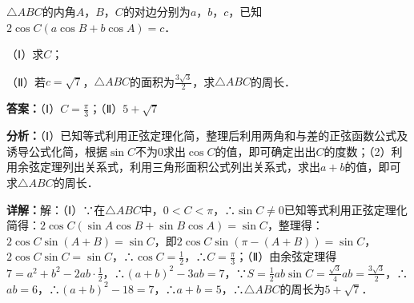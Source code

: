 \begin{question}[points=12]
$\triangle ABC$的内角$A$，$B$，$C$的对边分别为$a$，$b$，$c$，已知$2\cos C(a\cos B+b\cos A)=c$．

（Ⅰ）求$C$；

（Ⅱ）若$c=\sqrt{7}$，$\triangle ABC$的面积为$\frac{3\sqrt{3}}{2}$，求$\triangle ABC$的周长．
\begin{solution}
\textbf{答案：}（Ⅰ）$C=\frac{\pi}{3}$；（Ⅱ）$5+\sqrt{7}$

\textbf{分析：}（Ⅰ）已知等式利用正弦定理化简，整理后利用两角和与差的正弦函数公式及诱导公式化简，根据$\sin C$不为$0$求出$\cos C$的值，即可确定出出$C$的度数；（2）利用余弦定理列出关系式，利用三角形面积公式列出关系式，求出$a+b$的值，即可求$\triangle ABC$的周长．

\textbf{详解：}解：（Ⅰ）∵在$\triangle ABC$中，$0<C<\pi$，∴$\sin C\neq0$已知等式利用正弦定理化简得：$2\cos C(\sin A\cos B+\sin B\cos A)=\sin C$，整理得：$2\cos C\sin(A+B)=\sin C$，即$2\cos C\sin(\pi-(A+B))=\sin C$，$2\cos C\sin C=\sin C$，∴$\cos C=\frac{1}{2}$，∴$C=\frac{\pi}{3}$；（Ⅱ）由余弦定理得$7=a^2+b^2-2ab\cdot\frac{1}{2}$，∴$(a+b)^2-3ab=7$，∵$S=\frac{1}{2}ab\sin C=\frac{\sqrt{3}}{4}ab=\frac{3\sqrt{3}}{2}$，∴$ab=6$，∴$(a+b)^2-18=7$，∴$a+b=5$，∴$\triangle ABC$的周长为$5+\sqrt{7}$．
\end{solution}
\end{question}

